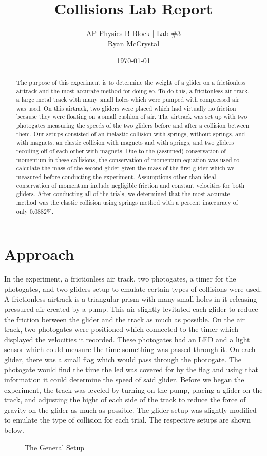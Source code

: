 \documentclass[12pt]{article}
\title{Collisions Lab Report}
\author{AP Physics B Block | Lab \#3\\Ryan McCrystal}
\date{\today}
\begin{document}
\maketitle
\newpage
\singlespacing
\tableofcontents
\doublespacing
\newpage

\begin{abstract}
	The purpose of this experiment is to determine the weight of a glider on a frictionless airtrack and the most accurate method for doing so. To do this, a fricitonless air track, a large metal track with many small holes which were pumped with compressed air was used. On this airtrack, two gliders were placed which had virtually no friction because they were floating on a small cushion of air. The airtrack was set up with two photogates measuring the speeds of the two gliders before and after a collision between them. Our setups consisted of an inelastic collision with springs, without springs, and with magnets, an elastic collision with magnets and with springs, and two gliders recoiling off of each other with magnets. Due to the (assumed) conservation of momentum in these collisions, the conservation of momentum equation was used to calculate the mass of the second glider given the mass of the first glider which we measured before conducting the experiment. Assumptions other than ideal conservation of momentum include negligible friction and constant velocities for both gliders. After conducting all of the trials, we determined that the most accurate method was the elastic collision using springs method with a percent inaccuracy of only $0.0882\%$. %
\end{abstract}
\newpage

\section{Approach}
In the experiment, a frictionless air track, two photogates, a timer for the photogates, and two gliders setup to emulate certain types of collisions were used. A frictionless airtrack is a triangular prism with many small holes in it releasing pressured air created by a pump. This air slightly levitated each glider to reduce the friction between the glider and the track as much as possible. On the air track, two photogates were positioned which connected to the timer which displayed the velocities it recorded. These photogates had an LED and a light sensor which could measure the time something was passed through it. On each glider, there was a small flag which would pass through the photogate. The photogate would find the time the led was covered for by the flag and using that information it could determine the speed of said glider. Before we began the experiment, the track was leveled by turning on the pump, placing a glider on the track, and adjusting the hight of each side of the track to reduce the force of gravity on the glider as much as possible. The glider setup was slightly modified to emulate the type of collision for each trial. The respective setups are shown below.
\begin{figure}[H]
	\centering
	\caption{The General Setup}
\end{figure}
\end{document}
